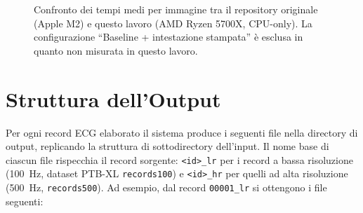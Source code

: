 \begin{figure}[H]
\centering
{}
\caption{Confronto dei tempi medi per immagine tra il repository originale (Apple M2) e questo lavoro (AMD Ryzen 5700X, CPU-only). La configurazione ``Baseline + intestazione stampata'' è esclusa in quanto non misurata in questo lavoro.}
\label{fig:bench_comparison}
\end{figure}

\section{Struttura dell'Output}

Per ogni record ECG elaborato il sistema produce i seguenti file nella directory di output, replicando la struttura di sottodirectory dell'input. Il nome base di ciascun file rispecchia il record sorgente: \texttt{<id>\_lr} per i record a bassa risoluzione (100~Hz, dataset PTB-XL \texttt{records100}) e \texttt{<id>\_hr} per quelli ad alta risoluzione (500~Hz, \texttt{records500}). Ad esempio, dal record \texttt{00001\_lr} si ottengono i file seguenti:

